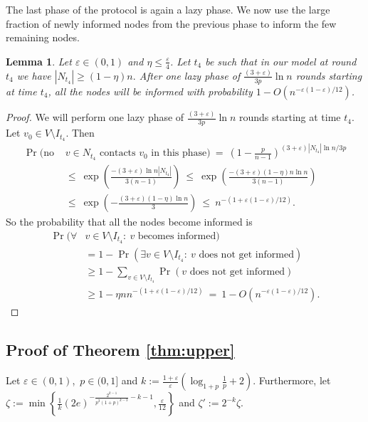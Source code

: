 \documentclass[12pt]{article}
\newtheorem{lemma}[theorem]{Lemma}
\newcommand{\e}{\varepsilon}
\begin{document}
{The last phase of the protocol is again a lazy phase. We now use the large fraction of newly informed nodes from the previous phase to inform the few remaining nodes.
\begin{lemma}\label{LazyPhase4}
Let $\e \in (0,1)$ and $\eta \leq \frac{\e}{4}$.
Let $t_4$ be such that in our model at round $t_4$ we have $
|N_{t_4}| \geq \left(1-\eta\right)n.$
 After one lazy phase of $\frac{(3+\e)}{3p}\ln n$ rounds starting at time $t_4$, all the nodes will be informed with probability $1-O(n^{-\e(1-\e)/12})$.
\end{lemma}
\begin{proof}
We will perform one lazy phase of $\frac{(3+\e)}{3p}\ln n$ rounds starting at time $t_4$.
Let $v_0\in V\setminus I_{t_4}$. Then
\begin{align*}
\Pr(\mbox{no } &v\in N_{t_4}\mbox{ contacts }v_0\mbox{ in this phase})\ 
=\ \left(1-\frac{p} {n-1} \right)^{(3+\e)|N_{t_4}|\ln n/3p}\\
&\leq\ \exp\left(\frac{-(3+\e)\ln n|N_{t_4}|}{3(n-1)}\right)
\ \leq\ \exp\left(\frac{-(3+\e)(1-\eta)n\ln n}{3(n-1)}\right)\\
&\leq\ \exp\left(-\frac{(3+\e)(1-\eta)\ln n}{3}\right)\ 
\leq\ n^{-\left(1+\e(1-\e)/12\right)}.
\end{align*}
So the probability that all the nodes become informed is
\begin{align*}
\Pr(\forall &v\in V\setminus I_{t_4}:\ v \mbox{ becomes informed})\\&=1-\Pr(\exists v\in V\setminus I_{t_4}:\ v\mbox{ does not get informed})\\
&\geq 1-\sum_{v\in V\setminus I_{t_4}}\Pr(v\mbox{ does not get informed})\\
&\geq 1-\eta n n^{-\left(1+\e(1-\e)/12\right)}\
=\ 1-O(n^{-\e(1-\e)/12}).
\end{align*} 
\end{proof}


\subsection{Proof of Theorem \ref{thm:upper}}

Let $\e \in (0,1)$,~$p \in (0,1]$ and $k := \frac{1+\e}{\e}\left(\log_{1+p}\frac{1}{p} + 2\right)$.
Furthermore, let 
$\zeta := \min\left\{ \frac{1}{k}(2e)^{-\frac{2^{k-1}}{p^3(1+p)^{k-3}} - k - 1}, \frac{\e}{12}\right\}$ and 
$\zeta' := 2^{-k}\zeta.$

}
\end{document}
